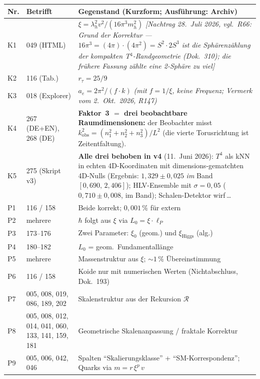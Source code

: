 \begingroup\small
\begin{longtable}{@{}p{0.9cm}p{3.1cm}p{10.2cm}@{}}
\toprule
\textbf{Nr.} & \textbf{Betrifft} & \textbf{Gegenstand (Kurzform; Ausf\"uhrung: Archiv)} \\
\midrule\endhead
\bottomrule\endfoot
K1 & 049 (HTML) & $\xi = \lambda_h^2 v^2/(16\pi^3 m_h^2)$ \emph{[Nachtrag 28.~Juli 2026, vgl.\ R66: Grund der Korrektur --- $16\pi^3 = (4\pi)\cdot(4\pi^2) = S^2\cdot 2S^3$ ist die Sphärenzählung der kompakten T$^4$-Randgeometrie (Dok.~310); die frühere Fassung zählte eine 2-Sphäre zu viel]} \\
K2 & 116 (Tab.) & $r_\tau = 25/9$ \\
K3 & 018 (Explorer) & $a_e = 2\pi^2/(f \cdot k)$ \emph{(mit $f = 1/\xi$, keine Frequenz; Vermerk vom 2.~Okt.~2026, R147)} \\
K4 & 267 (DE+EN), 268 (DE) & \textbf{Faktor~3 $=$ drei beobachtbare Raumdimensionen:} der Beobachter misst $k_\mathrm{obs}^2=(n_1^2+n_2^2+n_3^2)/L^2$ (die vierte Torusrichtung ist Zeitentfaltung). \\
K5 & 275 (Skript v3) & \textbf{Alle drei behoben in v4} (11.~Juni 2026): $T^4$ als kNN in echten 4D-Koordinaten mit dimensions-gematchten 4D-Nulls (Ergebnis: $1{,}329\pm0{,}025$ \emph{im} Band $[0{,}690,\,2{,}406]$); HLV-Ensemble mit $\sigma=0{,}05$ ($0{,}710\pm0{,}008$, im Band); Schalen-Detektor wirf\,\ldots \\
P1 & 116 / 158 & Beide korrekt; $0{,}001\,\%$ für extern \\
P2 & mehrere & $\hbar$ folgt aus $\xi$ via $L_0 = \xi\cdot\ell_P$ \\
P3 & 173--176 & Zwei Parameter: $\xi_0$ (geom.) und $\xi_{\text{Higgs}}$ (alg.) \\
P4 & 180--182 & $L_0$ = geom.\ Fundamentallänge \\
P5 & mehrere & Massenstruktur aus $\xi$; $\sim 1\,\%$ Übereinstimmung \\
P6 & 116 / 158 & Koide nur mit numerischen Werten (Nichtabschluss, Dok.~193) \\
P7 & 005, 008, 019, 086, 189, 202 & Skalenstruktur aus der Rekursion $\mathcal{R}$ \\
P8 & 005, 008, 012, 014, 041, 060, 133, 141, 159, 181 & Geometrische Skalen\-anpassung / fraktale Korrektur \\
P9 & 005, 006, 042, 046 & Spalten \enquote{Skalierungs\-klasse} + \enquote{SM-Korrespondenz}; \newline Quarks via $m = r\,\xi^p\,v$ \\

\end{longtable}
